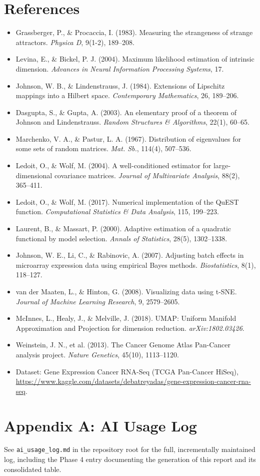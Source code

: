 \documentclass[11pt]{article}
\begin{document}
\section{References}

\begin{itemize}
\item Grassberger, P., \& Procaccia, I. (1983). Measuring the strangeness
of strange attractors. \emph{Physica D}, 9(1-2), 189--208.
\item Levina, E., \& Bickel, P. J. (2004). Maximum likelihood estimation
of intrinsic dimension. \emph{Advances in Neural Information Processing
Systems}, 17.
\item Johnson, W. B., \& Lindenstrauss, J. (1984). Extensions of Lipschitz
mappings into a Hilbert space. \emph{Contemporary Mathematics}, 26, 189--206.
\item Dasgupta, S., \& Gupta, A. (2003). An elementary proof of a theorem
of Johnson and Lindenstrauss. \emph{Random Structures \& Algorithms},
22(1), 60--65.
\item Marchenko, V. A., \& Pastur, L. A. (1967). Distribution of
eigenvalues for some sets of random matrices. \emph{Mat. Sb.}, 114(4), 507--536.
\item Ledoit, O., \& Wolf, M. (2004). A well-conditioned estimator for
large-dimensional covariance matrices. \emph{Journal of Multivariate
Analysis}, 88(2), 365--411.
\item Ledoit, O., \& Wolf, M. (2017). Numerical implementation of the
QuEST function. \emph{Computational Statistics \& Data Analysis}, 115,
199--223.
\item Laurent, B., \& Massart, P. (2000). Adaptive estimation of a
quadratic functional by model selection. \emph{Annals of Statistics},
28(5), 1302--1338.
\item Johnson, W. E., Li, C., \& Rabinovic, A. (2007). Adjusting batch
effects in microarray expression data using empirical Bayes methods.
\emph{Biostatistics}, 8(1), 118--127.
\item van der Maaten, L., \& Hinton, G. (2008). Visualizing data using
t-SNE. \emph{Journal of Machine Learning Research}, 9, 2579--2605.
\item McInnes, L., Healy, J., \& Melville, J. (2018). UMAP: Uniform
Manifold Approximation and Projection for dimension reduction.
\emph{arXiv:1802.03426}.
\item Weinstein, J. N., et al. (2013). The Cancer Genome Atlas Pan-Cancer
analysis project. \emph{Nature Genetics}, 45(10), 1113--1120.
\item Dataset: Gene Expression Cancer RNA-Seq (TCGA Pan-Cancer HiSeq),
\url{https://www.kaggle.com/datasets/debatreyadas/gene-expression-cancer-rna-seq}.
\end{itemize}

\appendix
\section{Appendix A: AI Usage Log}
See \texttt{ai\_usage\_log.md} in the repository root for the full,
incrementally maintained log, including the Phase 4 entry documenting the
generation of this report and its consolidated table.
\end{document}
